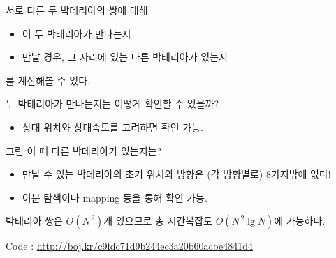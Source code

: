 \documentclass[hyperref={unicode}]{beamer}
\begin{document}
    
    \begin{frame}
         서로 다른 두 박테리아의 쌍에 대해
        \begin{itemize}
            \item<2-> 이 두 박테리아가 만나는지
            \item<3-> 만날 경우, 그 자리에 있는 다른 박테리아가 있는지
        \end{itemize}
         를 계산해볼 수 있다.
    \end{frame}
    
    \begin{frame}
         두 박테리아가 만나는지는 어떻게 확인할 수 있을까?
        \begin{itemize}
            \item<2-> 상대 위치와 상대속도를 고려하면 확인 가능.
        \end{itemize}
         그럼 이 때 다른 박테리아가 있는지는?
        \begin{itemize}
            \item<4-> 만날 수 있는 박테리아의 초기 위치와 방향은 {\smallgray(각 방향별로)} 8가지밖에 없다!
            \item<5-> 이분 탐색이나 mapping 등을 통해 확인 가능.
        \end{itemize}
         박테리아 쌍은 $ O(N^{\,2}) $개 있으므로 총 시간복잡도 $ O(N^{\,2} \lg N) $에 가능하다.
    \end{frame}
    
    \begin{frame}
        Code : \url{http://boj.kr/c9fdc71d9b244ec3a20b60acbe4841d4}
    \end{frame}
    
\end{document}
